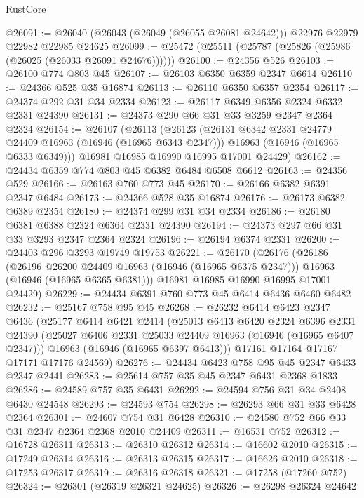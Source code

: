 \begin{lexlean}{RustCore}
\begin{coremodule}
@26091 := @26040 (@26043 (@26049 (@26055 @26081 @24642))) @22976 @22979 @22982 @22985 @24625
@26099 := @25472 (@25511 (@25787 (@25826 (@25986 (@26025 (@26033 @26091 @24676))))))
@26100 := @24356 @526
@26103 := @26100 @774 @803 @45
@26107 := @26103 @6350 @6359 @2347 @6614
@26110 := @24366 @525 @35 @16874
@26113 := @26110 @6350 @6357 @2354
@26117 := @24374 @292 @31 @34 @2334
@26123 := @26117 @6349 @6356 @2324 @6332 @2331 @24390
@26131 := @24373 @290 @66 @31 @33 @3259 @2347 @2364 @2324
@26154 := @26107
    (@26113
      (@26123
        (@26131 @6342 @2331 @24779 @24409 @16963 (@16946 (@16965 @6343 @2347)))
        @16963
        (@16946 (@16965 @6333 @6349)))
      @16981
      @16985
      @16990
      @16995
      @17001
      @24429)
@26162 := @24434 @6359 @774 @803 @45 @6382 @6484 @6508 @6612
@26163 := @24356 @529
@26166 := @26163 @760 @773 @45
@26170 := @26166 @6382 @6391 @2347 @6484
@26173 := @24366 @528 @35 @16874
@26176 := @26173 @6382 @6389 @2354
@26180 := @24374 @299 @31 @34 @2334
@26186 := @26180 @6381 @6388 @2324 @6364 @2331 @24390
@26194 := @24373 @297 @66 @31 @33 @3293 @2347 @2364 @2324
@26196 := @26194 @6374 @2331
@26200 := @24403 @296 @3293 @19749 @19753
@26221 := @26170
    (@26176
      (@26186
        (@26196 @26200 @24409 @16963 (@16946 (@16965 @6375 @2347)))
        @16963
        (@16946 (@16965 @6365 @6381)))
      @16981
      @16985
      @16990
      @16995
      @17001
      @24429)
@26229 := @24434 @6391 @760 @773 @45 @6414 @6436 @6460 @6482
@26232 := @25167 @758 @95 @45
@26268 := @26232
    @6414
    @6423
    @2347
    @6436
    (@25177
      @6414
      @6421
      @2414
      (@25013
        @6413
        @6420
        @2324
        @6396
        @2331
        @24390
        (@25027 @6406 @2331 @25033 @24409 @16963 (@16946 (@16965 @6407 @2347)))
        @16963
        (@16946 (@16965 @6397 @6413)))
      @17161
      @17164
      @17167
      @17171
      @17176
      @24569)
@26276 := @24434 @6423 @758 @95 @45 @2347 @6433 @2347 @2441
@26283 := @25614 @757 @35 @45 @2347 @6431 @2368 @1833
@26286 := @24589 @757 @35 @6431
@26292 := @24594 @756 @31 @34 @2408 @6430 @24548
@26293 := @24593 @754
@26298 := @26293 @66 @31 @33 @6428 @2364
@26301 := @24607 @754 @31 @6428
@26310 := @24580 @752 @66 @33 @31 @2347 @2364 @2368 @2010 @24409
@26311 := @16531 @752
@26312 := @16728 @26311
@26313 := @26310 @26312
@26314 := @16602 @2010
@26315 := @17249 @26314
@26316 := @26313 @26315
@26317 := @16626 @2010
@26318 := @17253 @26317
@26319 := @26316 @26318
@26321 := @17258 (@17260 @752)
@26324 := @26301 (@26319 @26321 @24625)
@26326 := @26298 @26324 @24642

\end{coremodule}
\end{lexlean}
